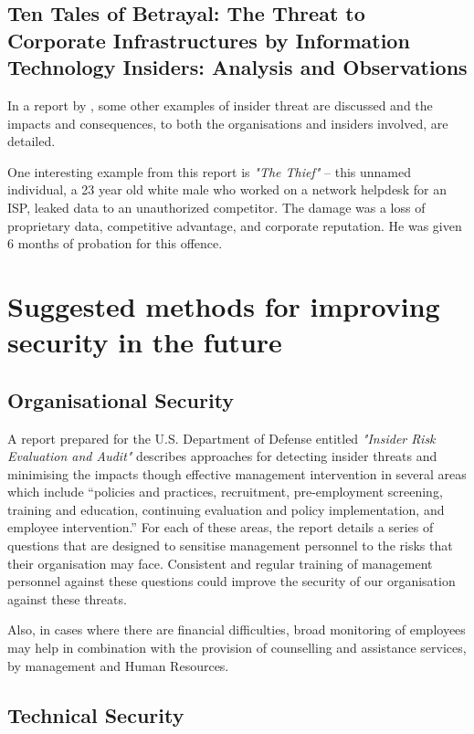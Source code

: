 \documentclass[12pt]{report}
\begin{document}
\subsection*{Ten Tales of Betrayal: The Threat to Corporate Infrastructures by Information Technology Insiders: Analysis and Observations}
In a report by \cite{pdf:perserec:insider_threat_examples:200509}, some other examples of insider threat are discussed and the impacts and consequences, to both the organisations and insiders involved, are detailed.

One interesting example from this report is \textit{"The Thief"} -- this unnamed individual, a 23 year old white male who worked on a network helpdesk for an ISP, leaked data to an unauthorized competitor. The damage was a loss of proprietary data, competitive advantage, and corporate reputation. He was given 6 months of probation for this offence.


\section{Suggested methods for improving security in the future}
\subsection*{Organisational Security}
A report prepared for the U.S. Department of Defense entitled \textit{"Insider Risk Evaluation and Audit"} \citeyearpar{pdf:dod:insider_risk:200908} describes approaches for detecting insider threats and minimising the impacts though effective management intervention in several areas which include ``policies and practices, recruitment, pre-employment screening, training and education, continuing evaluation and policy implementation, and employee intervention.'' For each of these areas, the report details a series of questions that are designed to sensitise management personnel to the risks that their organisation may face. Consistent and regular training of management personnel against these questions could improve the security of our organisation against these threats.

Also, in cases where there are financial difficulties, broad monitoring of employees may help in combination with the provision of counselling and assistance services, by management and Human Resources.

\subsection*{Technical Security}
\end{document}
